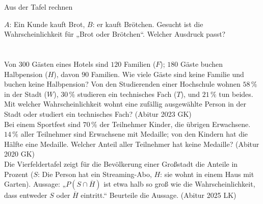 \setcounter{aufgabe}{10}

\begin{aufgabe}{Aus der Tafel rechnen}
\begin{teile}
\teil $A$: Ein Kunde kauft Brot, $B$: er kauft Brötchen. Gesucht ist die Wahrscheinlichkeit für „Brot oder Brötchen“. Welcher Ausdruck passt? \\  \\  \\ 
\teil Von $300$ Gästen eines Hotels sind $120$ Familien ($F$); $180$ Gäste buchen Halbpension ($H$), davon $90$ Familien. Wie viele Gäste sind keine Familie und buchen keine Halbpension? \leerfeld
\teil Von den Studierenden einer Hochschule wohnen $58\,\%$ in der Stadt ($W$), $30\,\%$ studieren ein technisches Fach ($T$), und $21\,\%$ tun beides. Mit welcher Wahrscheinlichkeit wohnt eine zufällig ausgewählte Person in der Stadt oder studiert ein technisches Fach? \hfill (Abitur 2023 GK) \\ \leerfeld[\%]
\teil Bei einem Sportfest sind $70\,\%$ der Teilnehmer Kinder, die übrigen Erwachsene. $14\,\%$ aller Teilnehmer sind Erwachsene mit Medaille; von den Kindern hat die Hälfte eine Medaille. Welcher Anteil aller Teilnehmer hat keine Medaille? \hfill (Abitur 2020 GK) \\ \leerfeld[\%]
\teil Die Vierfeldertafel zeigt für die Bevölkerung einer Großstadt die Anteile in Prozent ($S$: Die Person hat ein Streaming-Abo, $H$: sie wohnt in einem Haus mit Garten). Aussage: „$P(S \cap \overline{H})$ ist etwa halb so groß wie die Wahrscheinlichkeit, dass entweder $S$ oder $\overline{H}$ eintritt.“ Beurteile die Aussage. \hfill (Abitur 2025 LK)

\end{teile}
\end{aufgabe}

